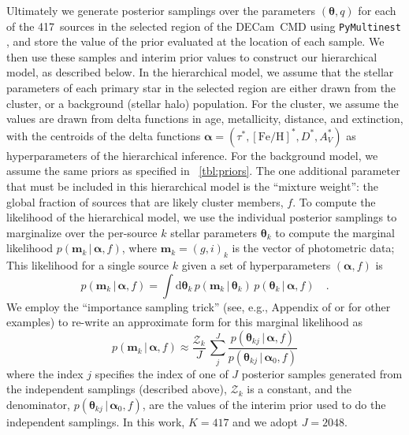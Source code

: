 \documentclass[twocolumn]{aastex62}
\newcommand{\decam}{DECam}
\newcommand{\bs}[1]{\boldsymbol{#1}}
\newcommand{\given}{\,|\,}
\newcommand{\dd}{\mathrm{d}}
\newcommand{\feh}{\ensuremath{[\textrm{Fe} / \textrm{H}]}}
\newcommand{\Nisofit}{417}
\begin{document}
Ultimately we generate posterior samplings over the parameters $(\bs{\theta}, q)$ for each of the \Nisofit\ sources in the selected region of the \decam\ CMD using \texttt{PyMultinest} \citep{TODO}, and store the value of the prior evaluated at the location of each sample.
We then use these samples and interim prior values to construct our hierarchical model, as described below.
In the hierarchical model, we assume that the stellar parameters of each primary star in the selected region are either drawn from the cluster, or a background (stellar halo) population.
For the cluster, we assume the values are drawn from delta functions in age, metallicity, distance, and extinction, with the centroids of the delta functions $\bs{\alpha} = (\tau^*, \feh^*, D^*, A_V^*)$ as hyperparameters of the hierarchical inference.
For the background model, we assume the same priors as specified in \tablename~\ref{tbl:priors}.
The one additional parameter that must be included in this hierarchical model is the ``mixture weight'': the global fraction of sources that are likely cluster members, $f$.
To compute the likelihood of the hierarchical model, we use the individual posterior samplings to marginalize over the per-source $k$ stellar parameters $\bs{\theta}_k$ to compute the marginal likelihood $p(\bs{m}_k \given \bs{\alpha}, f)$, where $\bs{m}_k = (g, i)_k$ is the vector of photometric data;
This likelihood for a single source $k$ given a set of hyperparameters $(\bs{\alpha}, f)$ is
\begin{equation}
    p(\bs{m}_k \given \bs{\alpha}, f) = \int \dd \bs{\theta}_k \,
        p(\bs{m}_k \given \bs{\theta}_k) \,
        p(\bs{\theta}_k \given \bs{\alpha}, f) \quad .
\end{equation}
We employ the ``importance sampling trick'' (see, e.g., Appendix of \citealt{Price-Whelan:2018} or \citealt{Hogg:2010, Foreman-Mackey:2014} for other examples) to re-write an approximate form for this marginal likelihood as
\begin{equation}
    p(\bs{m}_k \given \bs{\alpha}, f) \approx \frac{\mathcal{Z}_k}{J} \,
        \sum_j^J \frac{p(\bs{\theta}_{kj} \given \bs{\alpha}, f)}{p(\bs{\theta}_{kj} \given \bs{\alpha}_0, f)}
        \label{eq:marglike}
\end{equation}
where the index $j$ specifies the index of one of $J$ posterior samples generated from the independent samplings (described above), $\mathcal{Z}_k$ is a constant, and the denominator, $p(\bs{\theta}_{kj} \given \bs{\alpha}_0, f)$, are the values of the interim prior used to do the independent samplings.
In this work, $K=\Nisofit$ and we adopt $J=2048$.
\end{document}
